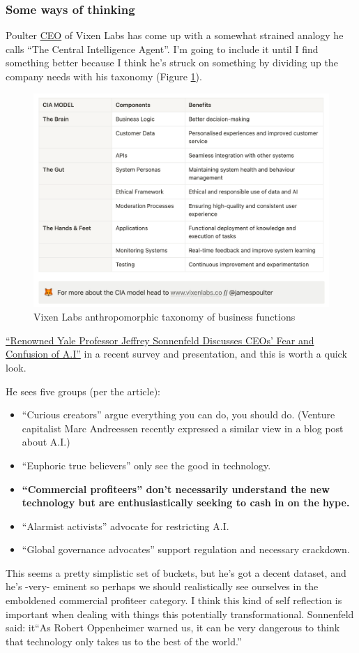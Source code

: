 \subsubsection{Some ways of thinking}
Poulter \href{https://twitter.com/jamespoulter}{CEO} of Vixen Labs has come up with a somewhat strained analogy he calls ``The Central Intelligence Agent''. I'm going to include it until I find something better because I think he's struck on something by dividing up the company needs with his taxonomy (Figure \ref{fig:vixenAnthro}).
\begin{figure}[htbp]
    \centering
    \includegraphics{vixenanthro}
    \caption{Vixen Labs anthropomorphic taxonomy of business functions}
    \label{fig:vixenAnthro}
\end{figure}
\href{https://observer.com/2023/06/ceo-ai-survey-yale-professor/}{``Renowned Yale Professor Jeffrey Sonnenfeld Discusses CEOs’ Fear and Confusion of A.I''} in a recent survey and presentation, and this is worth a quick look.\par
He sees five groups (per the article):
\begin{itemize}
\item ``Curious creators'' argue everything you can do, you should do. (Venture capitalist Marc Andreessen recently expressed a similar view in a blog post about A.I.)
\item ``Euphoric true believers'' only see the good in technology.
\item \textbf{``Commercial profiteers'' don’t necessarily understand the new technology but are enthusiastically seeking to cash in on the hype.}
\item ``Alarmist activists'' advocate for restricting A.I.
\item ``Global governance advocates'' support regulation and necessary crackdown.
\end{itemize}
This seems a pretty simplistic set of buckets, but he's got a decent dataset, and he's -very- eminent so perhaps we should realistically see ourselves in the emboldened commercial profiteer category. I think this kind of self reflection is important when dealing with things this potentially transformational. Sonnenfeld said: it{``As Robert Oppenheimer warned us, it can be very dangerous to think that technology only takes us to the best of the world.''}
